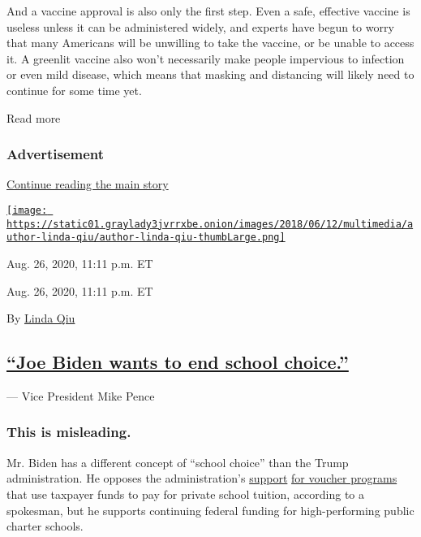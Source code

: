 And a vaccine approval is also only the first step. Even a safe,
effective vaccine is useless unless it can be administered widely, and
experts have begun to worry that many Americans will be unwilling to
take the vaccine, or be unable to access it. A greenlit vaccine also
won't necessarily make people impervious to infection or even mild
disease, which means that masking and distancing will likely need to
continue for some time yet.

Read more

\hypertarget{advertisement-1}{%
\subsubsection{Advertisement}\label{advertisement-1}}

\protect\hyperlink{after-dfp-ad-mid2}{Continue reading the main story}

\href{https://www.nytimes3xbfgragh.onion/by/linda-qiu}{\texttt{[image: https://static01.graylady3jvrrxbe.onion/images/2018/06/12/multimedia/author-linda-qiu/author-linda-qiu-thumbLarge.png]}}

Aug. 26, 2020, 11:11 p.m. ET

Aug. 26, 2020, 11:11 p.m. ET

By \href{https://www.nytimes3xbfgragh.onion/by/linda-qiu}{Linda Qiu}

\hypertarget{joe-biden-wants-to-end-school-choice}{%
\subsection{\texorpdfstring{\protect\hyperlink{joe-biden-wants-to-end-school-choice}{``Joe
Biden wants to end school
choice.''}}{``Joe Biden wants to end school choice.''}}\label{joe-biden-wants-to-end-school-choice}}

--- Vice President Mike Pence

\hypertarget{this-is-misleading-3}{%
\subsubsection{\texorpdfstring{\textbf{This is
misleading.}}{This is misleading.}}\label{this-is-misleading-3}}

Mr. Biden has a different concept of ``school choice'' than the Trump
administration. He opposes the administration's
\href{https://slack-redir.net/link?url=https\%3A\%2F\%2Fwww.nytimes3xbfgragh.onion\%2F2020\%2F02\%2F25\%2Fus\%2Fpolitics\%2Fcharter-schools-trump-devos-democrats.html}{support}
\href{https://slack-redir.net/link?url=https\%3A\%2F\%2Fwww.nytimes3xbfgragh.onion\%2F2017\%2F12\%2F02\%2Fus\%2Fpolitics\%2Fbetsy-devos-school-choice-vouchers-trump.html}{for
voucher programs} that use taxpayer funds to pay for private school
tuition, according to a spokesman, but he supports continuing federal
funding for high-performing public charter schools.

